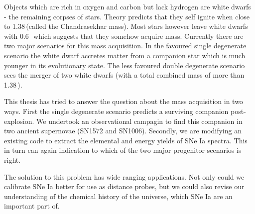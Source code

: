 Objects which are rich in oxygen and carbon but lack hydrogen are white dwarfs - the remaining corpses of stars. Theory predicts that they self ignite when close to 1.38\,\msun (called the Chandrasekhar mass). Most stars however leave white dwarfs with 0.6\,\msun\ which suggests that they somehow acquire mass. Currently there are two major scenarios for this mass acquisition. In the favoured single degenerate scenario the white dwarf accretes matter from a companion star which is much younger in its evolutionary state. The less favoured double degenerate scenario sees the merger of two white dwarfs (with a total combined mass of more than 1.38\,\msun). 

This thesis has tried to answer the question about the mass acquisition in two ways. First the single degenerate scenario predicts a surviving companion post-explosion. We undertook an observational campagin to find this companion in two ancient supernovae (SN1572 and SN1006). Secondly, we are modifying an existing code to extract the elemental and energy yields of SNe Ia spectra. This in turn can again indication to which of the two major progenitor scenarios is right. 

The solution to this problem has wide ranging applications. Not only could we calibrate SNe Ia better for use as distance probes, but we could also revise our understanding of the chemical history of the universe, which SNe Ia are an important part of. 






